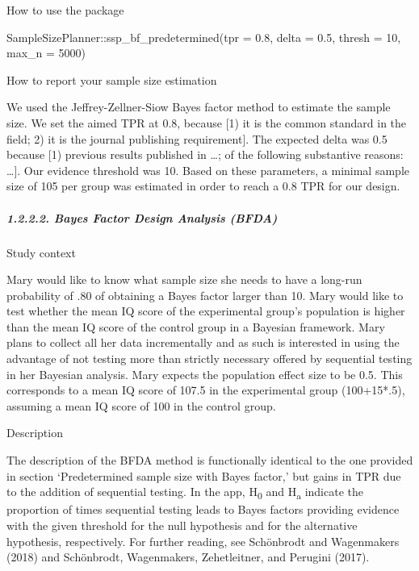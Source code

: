 \documentclass[
  english,
  man,floatsintext]{apa6}
\newenvironment{Shaded}{\begin{snugshade}}{\end{snugshade}}
\newcommand{\AttributeTok}[1]{\textcolor[rgb]{0.77,0.63,0.00}{#1}}
\newcommand{\DecValTok}[1]{\textcolor[rgb]{0.00,0.00,0.81}{#1}}
\newcommand{\FloatTok}[1]{\textcolor[rgb]{0.00,0.00,0.81}{#1}}
\newcommand{\FunctionTok}[1]{\textcolor[rgb]{0.00,0.00,0.00}{#1}}
\newcommand{\NormalTok}[1]{#1}
\newcommand{\SpecialCharTok}[1]{\textcolor[rgb]{0.00,0.00,0.00}{#1}}
\let\oldsubparagraph\subparagraph
\renewcommand{\subparagraph}[1]{\oldsubparagraph{#1}\mbox{}}
\begin{document}
How to use the package

\begin{Shaded}
\begin{Highlighting}[]
\NormalTok{SampleSizePlanner}\SpecialCharTok{::}\FunctionTok{ssp\_bf\_predetermined}\NormalTok{(}\AttributeTok{tpr =} \FloatTok{0.8}\NormalTok{, }\AttributeTok{delta =} \FloatTok{0.5}\NormalTok{, }
    \AttributeTok{thresh =} \DecValTok{10}\NormalTok{, }\AttributeTok{max\_n =} \DecValTok{5000}\NormalTok{)}
\end{Highlighting}
\end{Shaded}

How to report your sample size estimation

We used the Jeffrey-Zellner-Siow Bayes factor method to estimate the sample size. We set the aimed TPR at 0.8, because {[}1) it is the common standard in the field; 2) it is the journal publishing requirement{]}. The expected delta was 0.5 because {[}1) previous results published in \ldots; of the following substantive reasons: \ldots{]}. Our evidence threshold was 10. Based on these parameters, a minimal sample size of 105 per group was estimated in order to reach a 0.8 TPR for our design.

\hypertarget{bayes-factor-design-analysis-bfda}{%
\subparagraph{1.2.2.2. Bayes Factor Design Analysis (BFDA)}\label{bayes-factor-design-analysis-bfda}}

Study context

Mary would like to know what sample size she needs to have a long-run probability of .80 of obtaining a Bayes factor larger than 10. Mary would like to test whether the mean IQ score of the experimental group's population is higher than the mean IQ score of the control group in a Bayesian framework. Mary plans to collect all her data incrementally and as such is interested in using the advantage of not testing more than strictly necessary offered by sequential testing in her Bayesian analysis. Mary expects the population effect size to be 0.5. This corresponds to a mean IQ score of 107.5 in the experimental group (100+15*.5), assuming a mean IQ score of 100 in the control group.

Description

The description of the BFDA method is functionally identical to the one provided in section `Predetermined sample size with Bayes factor,' but gains in TPR due to the addition of sequential testing. In the app, H\textsubscript{0} and H\textsubscript{a} indicate the proportion of times sequential testing leads to Bayes factors providing evidence with the given threshold for the null hypothesis and for the alternative hypothesis, respectively. For further reading, see Schönbrodt and Wagenmakers (2018) and Schönbrodt, Wagenmakers, Zehetleitner, and Perugini (2017).
\end{document}
